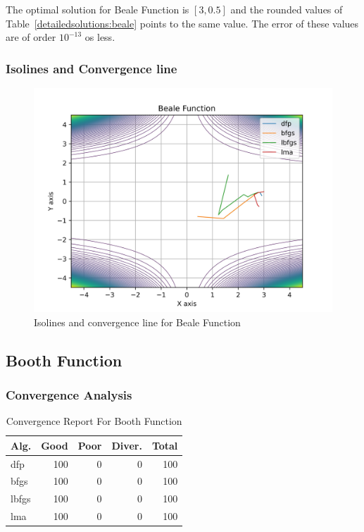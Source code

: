 \documentclass[conference]{IEEEtran}
\begin{document}
The optimal solution for Beale Function is $[3, 0.5]$ and the rounded values
of Table~\ref{detailedsolutions:beale} points to the same value. The error of
these values are of order $10^{-13}$ os less.



\subsubsection{Isolines and Convergence line}
\label{isolinesbeale2D}

\begin{figure}[H]
\centering
\caption{Isolines and convergence line for Beale Function}
\label{fig:beale}
\includegraphics[scale=0.5]{images/beale.jpg}
\end{figure}
\subsection{Booth Function}
\label{booth2D}

\subsubsection{Convergence Analysis}
\label{convergencebooth2D}

\begin{table}[H]
\centering
\caption{Convergence Report For Booth Function}
\label{convergence:booth}
\begin{tabular}{lrrrr}
\toprule
 Alg. &  Good &  Poor &  Diver. &  Total \\
\midrule
  dfp &   100 &     0 &       0 &    100 \\
 bfgs &   100 &     0 &       0 &    100 \\
lbfgs &   100 &     0 &       0 &    100 \\
  lma &   100 &     0 &       0 &    100 \\
\bottomrule
\end{tabular}
\end{table}
\end{document}
